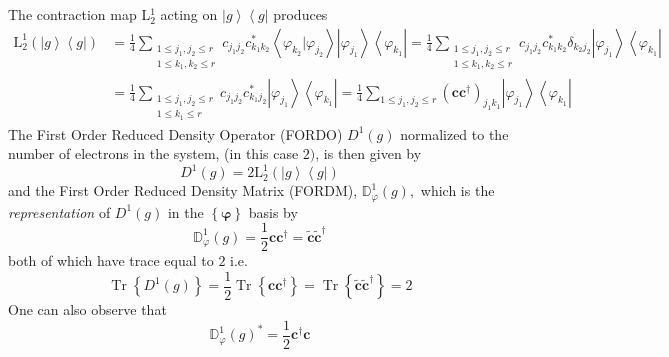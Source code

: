 \documentclass[aps,preprint]{revtex4}%
\begin{document}
The contraction map \textrm{L}$_{2}^{1}$ \cite{Weiner84}\cite{kummar}%
\cite{lowdin} acting on $\left\vert g\right\rangle \left\langle g\right\vert $
produces
\begin{align}
\mathrm{L}_{2}^{1}\left(  \left\vert g\right\rangle \left\langle g\right\vert
\right)   &  =\frac{1}{4}\sum_{\substack{1\leq j_{1},j_{2}\leq r\\1\leq
k_{1},k_{2}\leq r}}c_{j_{1}j_{2}}c_{k_{1}k_{2}}^{\ast}\left\langle
\varphi_{k_{2}}|\varphi_{j_{2}}\right\rangle \left\vert \varphi_{j_{1}%
}\right\rangle \left\langle \varphi_{k_{1}}\right\vert =\frac{1}{4}%
\sum_{\substack{1\leq j_{1},j_{2}\leq r\\1\leq k_{1},k_{2}\leq r}%
}c_{j_{1}j_{2}}c_{k_{1}k_{2}}^{\ast}\delta_{k_{2}j_{2}}\left\vert
\varphi_{j_{1}}\right\rangle \left\langle \varphi_{k_{1}}\right\vert
\nonumber\\
&  =\frac{1}{4}\sum_{\substack{1\leq j_{1},j_{2}\leq r\\1\leq k_{1}\leq
r}}c_{j_{1}j_{2}}c_{k_{1}j_{2}}^{\ast}\left\vert \varphi_{j_{1}}\right\rangle
\left\langle \varphi_{k_{1}}\right\vert =\frac{1}{4}\sum_{1\leq j_{1}%
,j_{2}\leq r}\left(  \mathbf{cc}^{\dagger}\right)  _{j_{1}k_{1}}\left\vert
\varphi_{j_{1}}\right\rangle \left\langle \varphi_{k_{1}}\right\vert
\end{align}
The First Order Reduced Density Operator (FORDO) $D^{1}\left(  g\right)  $
normalized to the number of electrons in the system, (in this case $2)$, is
then given by
\begin{equation}
D^{1}\left(  g\right)  =2\mathrm{L}_{2}^{1}\left(  \left\vert g\right\rangle
\left\langle g\right\vert \right)
\end{equation}
and the First Order Reduced Density Matrix (FORDM), $\mathbb{D}_{\varphi}%
^{1}\left(  g\right)  ,$ which is the \emph{representation} of $D^{1}\left(
g\right)  $ in the $\left\{  \mathbf{\varphi}\right\}  $ basis by
\begin{equation}
\mathbb{D}_{\varphi}^{1}\left(  g\right)  =\frac{1}{2}\mathbf{cc}^{\dagger
}=\mathbf{\tilde{c}\tilde{c}}^{\dagger}%
\end{equation}
both of which have trace equal to $2$ i.e.
\begin{equation}
\operatorname{Tr}\left\{  D^{1}\left(  g\right)  \right\}  =\frac{1}%
{2}\operatorname{Tr}\left\{  \mathbf{cc}^{\dagger}\right\}  =\operatorname{Tr}%
\left\{  \mathbf{\tilde{c}\tilde{c}}^{\dagger}\right\}  =2
\end{equation}
One can also observe that
\begin{equation}
\mathbb{D}_{\varphi}^{1}\left(  g\right)  ^{\ast}=\frac{1}{2}\mathbf{c}%
^{\dagger}\mathbf{c}%
\end{equation}
\end{document}
